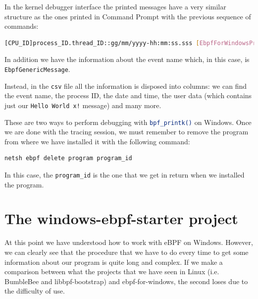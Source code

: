 In the kernel debugger interface the printed messages have a very similar structure as the ones printed in Command Prompt with the previous sequence of commands:

\begin{lstlisting}[style=commandline, language=bash, caption={Kernel debugging output messages format using \colorbox{backcolour}{\lstinline[style=commandline, language=bash]|tracelog|}.}]
	[CPU_ID]process_ID.thread_ID::gg/mm/yyyy-hh:mm:ss.sss [EbpfForWindowsProvider/EbpfGenericMessage]{"Message":"Hello World x!"}
\end{lstlisting}

In addition we have the information about the event name which, in this case, is \colorbox{backcolour}{\lstinline[style=commandline, language=bash, breaklines=true]|EbpfGenericMessage|}.

Instead, in the \colorbox{backcolour}{\lstinline[style=commandline, language=bash, breaklines=true]|csv|} file all the information is disposed into columns: we can find the event name, the process ID, the date and time, the user data (which contains just our \colorbox{backcolour}{\lstinline[style=commandline, language=bash, breaklines=true]|Hello World x!|} message) and many more. 

These are two ways to perform debugging with \colorbox{backcolour}{\lstinline[style=commandline, language=bash, breaklines=true]|bpf_printk()|} on Windows.
Once we are done with the tracing session, we must remember to remove the program from where we have installed it with the following command:

\begin{lstlisting}[style=commandline, language=bash, caption={``Hello world!''-like program delete command in ebpf-for-windows.}]
	netsh ebpf delete program program_id
\end{lstlisting}

In this case, the \colorbox{backcolour}{\lstinline[style=commandline, language=bash, breaklines=true]|program_id|} is the one that we get in return when we installed the program.

\section{The windows-ebpf-starter project}

At this point we have understood how to work with eBPF on Windows.
However, we can clearly see that the procedure that we have to do every time to get some information about our program is quite long and complex.
If we make a comparison between what the projects that we have seen in Linux (i.e. BumbleBee and libbpf-bootstrap) and ebpf-for-windows, the second loses due to the difficulty of use.

